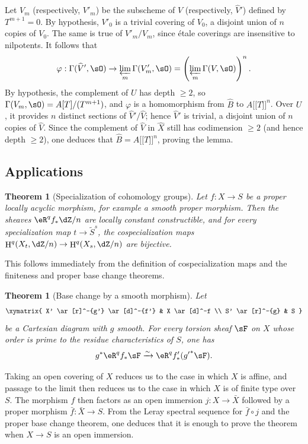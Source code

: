 \documentclass[12pt,oneside,english]{smfbook}
\DeclareMathOperator{\h}{H}
\newcounter{char}
\providecommand{\llbracket}{\mathopen{[\![}}
\providecommand{\rrbracket}{\mathclose{]\!]}}
\newcommand{\iso}{\xrightarrow\sim}
\newtheorem{theorem}[subsubsection]{Theorem}
\begin{document}
Let $V_m$ (respectively, $V'_m$) be the subscheme of $\widehat V$ (respectively, $\widehat V'$) defined by $T^{m+1}=0$. By hypothesis, $V'_0$ is a trivial covering of $V_0$, a disjoint union of $n$ copies of $V_0$. The same is true of $V'_m/V_m$, since étale coverings are insensitive to nilpotents. It follows that
\[
  \varphi : \Gamma(\widehat V',\sO) \to \varprojlim_m \Gamma(V_m',\sO) = \left(\varprojlim_m \Gamma(V,\sO)\right)^n \text{.}
\]
By hypothesis, the complement of $U$ has depth $\geqslant2$, so $\Gamma(V_m,\sO)=A[T]/(T^{m+1})$, and $\varphi$ is a homomorphism from $\widehat B$ to $A\llbracket T\rrbracket^n$. Over $U$, it provides $n$ distinct sections of $\widehat V'/\widehat V$; hence $\widehat V'$ is trivial, a disjoint union of $n$ copies of $\widehat V$. Since the complement of $\widehat V$ in $\widehat X$ still has codimension $\geqslant2$ (and hence depth $\geqslant2$), one deduces that $\widehat B=A\llbracket T\rrbracket^n$, proving the lemma.

\subsection{Applications}\label{I:5-3}

\begin{theorem}[Specialization of cohomology groups]\label{I:5-3-1}
Let $f:X\to S$ be a proper locally acyclic morphism, for example a smooth proper morphism. Then the sheaves $\eR^qf_*\dZ/n$ are locally constant constructible, and for every specialization map $t\to\widetilde S^s$, the cospecialization maps $\h^q(X_t,\dZ/n)\to\h^q(X_s,\dZ/n)$ are bijective.
\end{theorem}

This follows immediately from the definition of cospecialization maps and the finiteness and proper base change theorems.

\begin{theorem}[Base change by a smooth morphism]\label{I:5-3-2}
Let
\[\xymatrix{
  X' \ar[r]^-{g'} \ar[d]^-{f'}
    & X \ar[d]^-f \\
  S' \ar[r]^-{g}
    & S
}\]
be a Cartesian diagram with $g$ smooth. For every torsion sheaf $\sF$ on $X$ whose order is prime to the residue characteristics of $S$, one has
\[
  g^* \eR^q f_* \sF \iso \eR^q f_*'({g'}^* \sF) \text{.}
\]
\end{theorem}

Taking an open covering of $X$ reduces us to the case in which $X$ is affine, and passage to the limit then reduces us to the case in which $X$ is of finite type over $S$. The morphism $f$ then factors as an open immersion $j:X\to\bar X$ followed by a proper morphism $\bar f:\bar X\to S$. From the Leray spectral sequence for $\bar f\circ j$ and the proper base change theorem, one deduces that it is enough to prove the theorem when $X\to S$ is an open immersion.
\end{document}
